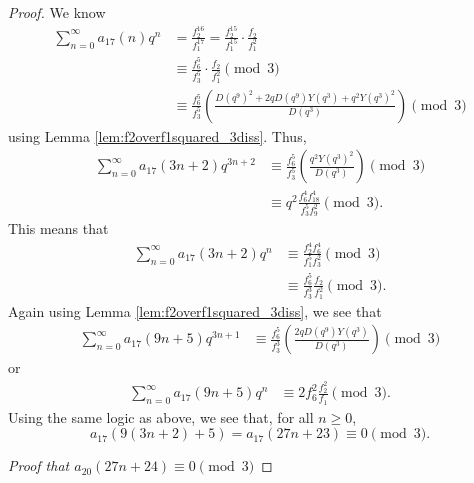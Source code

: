 \documentclass[10pt, reqno]{amsart}
\theoremstyle{theorem}
\theoremstyle{definition}
\theoremstyle{example}
\begin{document}
\begin{proof}
\noindent 
We know 
\begin{align*}
\sum_{n=0}^\infty a_{17}(n)q^n 
&= 
\frac{f_2^{16}}{f_1^{17}} = 
\frac{f_2^{15}}{f_1^{15}}\cdot \frac{f_2}{f_1^2} \\
&\equiv 
\frac{f_{6}^5}{f_3^5}\cdot \frac{f_2}{f_1^2} \pmod{3}  \\
&\equiv 
\frac{f_6^5}{f_3^5}\left( \frac{D(q^9)^2 +2qD(q^9)Y(q^3)+q^2Y(q^3)^2}{D(q^3)}  \right) \pmod{3} 
\end{align*}
using Lemma \ref{lem:f2overf1squared_3diss}.  
Thus, 
\begin{align*}
\sum_{n=0}^\infty a_{17}(3n+2)q^{3n+2} 
&\equiv 
\frac{f_6^5}{f_3^5}\left( \frac{q^2Y(q^3)^2}{D(q^3)} \right) \pmod{3}  \\
&\equiv 
q^2\frac{f_6^4f_{18}^4}{f_3^5f_9^2} \pmod{3}.
\end{align*}
This means that
\begin{align*}
\sum_{n=0}^\infty a_{17}(3n+2)q^{n} 
&\equiv 
\frac{f_2^4f_{6}^4}{f_1^5f_3^2} \pmod{3} \\
&\equiv 
\frac{f_6^5}{f_3^3}\frac{f_2}{f_1^2} \pmod{3}.
\end{align*}
Again using Lemma \ref{lem:f2overf1squared_3diss}, we see that 
\begin{align*}
\sum_{n=0}^\infty a_{17}(9n+5)q^{3n+1} 
&\equiv 
\frac{f_6^5}{f_3^3} \left( \frac{2qD(q^9)Y(q^3)}{D(q^3)} \right) \pmod{3}
\end{align*}
or 
\begin{align*}
\sum_{n=0}^\infty a_{17}(9n+5)q^{n} 
&\equiv 
2f_6^2\frac{f_2^2}{f_1} \pmod{3}.
\end{align*}
Using the same logic as above, we see that, for all $n\geq 0$, 
\begin{equation*}
a_{17}(9(3n+2)+5) = a_{17}(27n+23) \equiv 0 \pmod{3}. 
\end{equation*}


\bigskip  

\noindent
{\it Proof that $a_{20}(27n+24) \equiv 0 \pmod{3}$}

\bigskip 


\end{proof}
\end{document}
